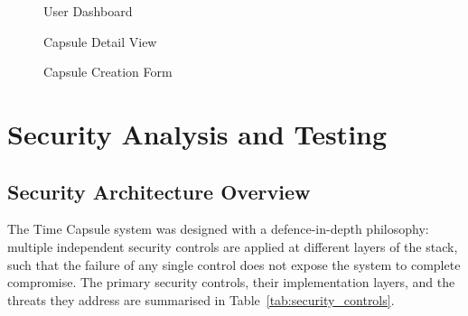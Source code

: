 \documentclass[12pt, a4paper]{article}
\begin{document}
\begin{figure}[H]
  \centering
  \caption{User Dashboard}
  \label{fig:dashboard}
\end{figure}

\begin{figure}[H]
  \centering
  \caption{Capsule Detail View}
  \label{fig:capsule_detail}
\end{figure}

\begin{figure}[H]
  \centering
  \caption{Capsule Creation Form}
  \label{fig:create_capsule}
\end{figure}

\section{Security Analysis and Testing}
\label{sec:security}

\subsection{Security Architecture Overview}

The Time Capsule system was designed with a defence-in-depth philosophy: multiple independent security controls are applied at different layers of the stack, such that the failure of any single control does not expose the system to complete compromise. The primary security controls, their implementation layers, and the threats they address are summarised in Table~\ref{tab:security_controls}.
\end{document}
